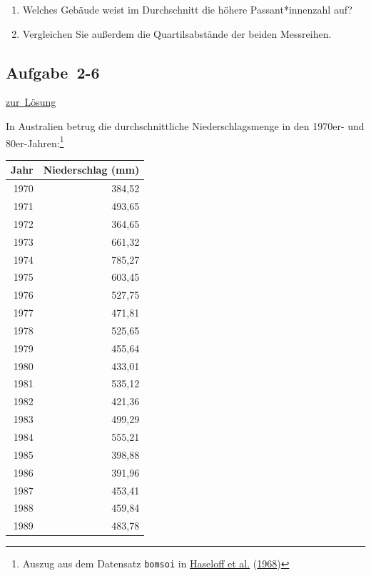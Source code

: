 \documentclass[
  11pt,
  ngerman,
  a4paper,
]{report}
\begin{document}
\begin{enumerate}
\def\labelenumi{\alph{enumi})}
\item
  Welches Gebäude weist im Durchschnitt die höhere Passant*innenzahl auf?
\item
  Vergleichen Sie außerdem die Quartilsabstände der beiden Messreihen.
\end{enumerate}

\hypertarget{aufgabe-2-6}{%
\subsection{Aufgabe~2-6}\label{aufgabe-2-6}}

\protect\hyperlink{loesung-2-6}{zur~Lösung}

In Australien betrug die durchschnittliche Niederschlagsmenge in den 1970er- und 80er-Jahren:\footnote{Auszug aus dem Datensatz \texttt{bomsoi} in \protect\hyperlink{ref-haseloff}{Haseloff et al.} (\protect\hyperlink{ref-haseloff}{1968})}
\nopagebreak

\begin{table}[H]
\centering
\begin{tabular}{rr}
\toprule
Jahr & Niederschlag (mm)\\
\midrule
1970 & 384,52\\
1971 & 493,65\\
1972 & 364,65\\
1973 & 661,32\\
1974 & 785,27\\
1975 & 603,45\\
1976 & 527,75\\
1977 & 471,81\\
1978 & 525,65\\
1979 & 455,64\\
1980 & 433,01\\
1981 & 535,12\\
1982 & 421,36\\
1983 & 499,29\\
1984 & 555,21\\
1985 & 398,88\\
1986 & 391,96\\
1987 & 453,41\\
1988 & 459,84\\
1989 & 483,78\\
\bottomrule
\end{tabular}
\end{table}
\end{document}
